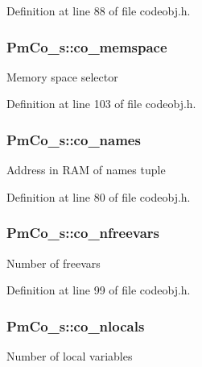 Definition at line 88 of file codeobj.\-h.

\hypertarget{struct_pm_co__s_a3dffa7919c52fc3e83647ddacae4990c}{
\subsubsection[{co\-\_\-memspace}]{ Pm\-Co\-\_\-s\-::co\-\_\-memspace}}\label{struct_pm_co__s_a3dffa7919c52fc3e83647ddacae4990c}
Memory space selector 

Definition at line 103 of file codeobj.\-h.

\hypertarget{struct_pm_co__s_a297d391e5506d9de5d9b9c9895c65be8}{
\subsubsection[{co\-\_\-names}]{ Pm\-Co\-\_\-s\-::co\-\_\-names}}\label{struct_pm_co__s_a297d391e5506d9de5d9b9c9895c65be8}
Address in R\-A\-M of names tuple 

Definition at line 80 of file codeobj.\-h.

\hypertarget{struct_pm_co__s_a7ef03b525c173d6bb420b9fcfd0623cc}{
\subsubsection[{co\-\_\-nfreevars}]{ Pm\-Co\-\_\-s\-::co\-\_\-nfreevars}}\label{struct_pm_co__s_a7ef03b525c173d6bb420b9fcfd0623cc}
Number of freevars 

Definition at line 99 of file codeobj.\-h.

\hypertarget{struct_pm_co__s_ad771f7601276ae5fac9d6412d126df29}{
\subsubsection[{co\-\_\-nlocals}]{ Pm\-Co\-\_\-s\-::co\-\_\-nlocals}}\label{struct_pm_co__s_ad771f7601276ae5fac9d6412d126df29}
Number of local variables 

